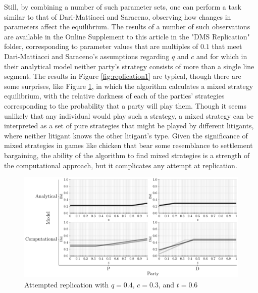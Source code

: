 \documentclass{article}
\begin{document}
Still, by combining a number of such parameter sets, one can perform a task similar to that of Dari-Mattiacci and Saraceno, observing how changes in parameters affect the equilibrium. The results of a number of such observations are available in the Online Supplement to this article in the "DMS Replication" folder, corresponding to parameter values that are multiples of $0.1$ that meet Dari-Mattiacci and Saraceno's assumptions regarding $q$ and $c$ and for which in their analytical model neither party's strategy consists of more than a single line segment. The results in Figure \ref{fig:replication1} are typical, though there are some surprises, like Figure \ref{fig:replication2}, in which the algorithm calculates a mixed strategy equilibrium, with the relative darkness of each of the parties' strategies corresponding to the probability that a party will play them. Though it seems unlikely that any individual would play such a strategy, a mixed strategy can be interpreted as a set of pure strategies that might be played by different litigants, where neither litigant knows the other litigant's type. Given the significance of mixed strategies in games like chicken that bear some resemblance to settlement bargaining, the ability of the algorithm to find mixed strategies is a strength of the computational approach, but it complicates any attempt at replication.

\begin{figure}[h!]
\centering
\includegraphics[scale=0.52, trim={0in 0in 0in 0in}, clip]{../Figures/replication2.pdf}
\caption{Attempted replication with $q = 0.4$, $c = 0.3$, and $t = 0.6$}
\label{fig:replication2}
\end{figure}
\end{document}
